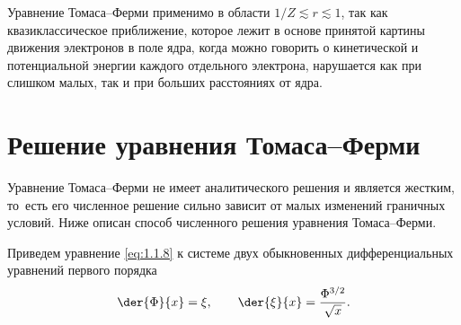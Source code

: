   Уравнение Томаса--Ферми применимо в области \( 1/Z \lesssim r \lesssim 1 \),
  так как квазиклассическое приближение, которое лежит в основе принятой картины
  движения электронов в поле ядра, когда можно говорить о кинетической и
  потенциальной энергии каждого отдельного электрона, нарушается как при слишком
  малых, так и при больших расстояниях от ядра.

  \section{Решение уравнения Томаса--Ферми}

  Уравнение Томаса--Ферми не имеет аналитического решения и является жестким,
  то~есть его численное решение сильно зависит от малых изменений граничных
  условий. Ниже описан способ численного решения уравнения Томаса--Ферми.
	
  Приведем уравнение \eqref{eq:1.1.8} к системе двух обыкновенных
  дифференциальных уравнений первого порядка
  \begin{equation}
    \der{\Phi}{x} = \xi, \qquad \der{\xi}{x} = \frac{\Phi^{3 / 2}}{\sqrt{x}}.
    \label{eq:1.1.10}
  \end{equation}